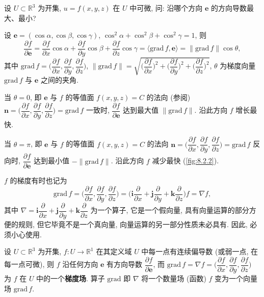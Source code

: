 \begin{example}\label{ex:8.2.4}
设 $U \subset \mathbb{R}^{3}$ 为开集, $u = f(x, y, z)$ 在 $U$ 中可微, 问: 沿哪个方向 $\boldsymbol{e}$ 的方向导数最大、最小?

\begin{solution}
设 $\boldsymbol{e} = (\cos\alpha, \cos\beta, \cos\gamma)$, $\cos^{2}\alpha + \cos^{2}\beta + \cos^{2}\gamma = 1$, 则
\[
  \frac{\partial f}{\partial \boldsymbol{e}} = \frac{\partial f}{\partial x}\cos\alpha + \frac{\partial f}{\partial y}\cos\beta + \frac{\partial f}{\partial z}\cos\gamma = \langle\mathrm{grad}\,f, \boldsymbol{e}\rangle = \|\mathrm{grad}\,f\|\cos\theta,
\]
其中 $\mathrm{grad}\,f = \Big(\dfrac{\partial f}{\partial x}, \dfrac{\partial f}{\partial y}, \dfrac{\partial f}{\partial z}\Big)$, $\|\mathrm{grad}\,f\| = \sqrt{\Big(\dfrac{\partial f}{\partial x}\Big)^{2} + \Big(\dfrac{\partial f}{\partial y}\Big)^{2} + \Big(\dfrac{\partial f}{\partial z}\Big)^{2}}$, $\theta$ 为梯度向量 $\mathrm{grad}\,f$ 与 $\boldsymbol{e}$ 之间的夹角.

当 $\theta = 0$, 即 $\boldsymbol{e}$ 与 $f$ 的等值面 $f(x, y, z) = C$ 的法向 (参阅) $\boldsymbol{n} = \Big(\dfrac{\partial f}{\partial x}, \dfrac{\partial f}{\partial y}, \dfrac{\partial f}{\partial z}\Big) = \mathrm{grad}\,f$ 一致时, $\dfrac{\partial f}{\partial \boldsymbol{e}}$ 达到最大值 $\|\mathrm{grad}\,f\|$. 沿此方向 $f$ 增长最快.

当 $\theta = \pi$, 即 $\boldsymbol{e}$ 与 $f$ 的等值面 $f(x, y, z) = C$ 的法向 $\boldsymbol{n} = \Big(\dfrac{\partial f}{\partial x}, \dfrac{\partial f}{\partial y}, \dfrac{\partial f}{\partial z}\Big) = \mathrm{grad}\,f$ 反向时, $\dfrac{\partial f}{\partial \boldsymbol{e}}$ 达到最小值 $-\|\mathrm{grad}\,f\|$. 沿此方向 $f$ 减少最快 (\cref{fig:8.2.2}).

$f$ 的梯度有时也记为
\[
  \mathrm{grad}\,f = \Big(\frac{\partial f}{\partial x}, \frac{\partial f}{\partial y}, \frac{\partial f}{\partial z}\Big) = \Big(\boldsymbol{i}\frac{\partial}{\partial x} + \boldsymbol{j}\frac{\partial}{\partial y} + \boldsymbol{k}\frac{\partial}{\partial z}\Big)f = \nabla f,
\]
其中 $\nabla = \boldsymbol{i}\dfrac{\partial}{\partial x} + \boldsymbol{j}\dfrac{\partial}{\partial y} + \boldsymbol{k}\dfrac{\partial}{\partial z}$ 为一个算子, 它是一个假向量, 具有向量运算的部分方便的规则, 但它毕竟不是一个真向量, 向量运算的另一部分性质未必具有. 因此, 必须小心使用.

设 $U \subset \mathbb{R}^{3}$ 为开集, $f: U \to \mathbb{R}^{1}$ 在其定义域 $U$ 中每一点有连续偏导数 (或弱一点, 在每一点可微), 则 $f$ 沿任何方向 $\boldsymbol{e}$ 有方向导数 $\dfrac{\partial f}{\partial \boldsymbol{e}}$, 而 $\mathrm{grad}\,f = \nabla f = \Big(\dfrac{\partial f}{\partial x}, \dfrac{\partial f}{\partial y}, \dfrac{\partial f}{\partial z}\Big)$ 为 $f$ 在 $U$ 中的一个\textbf{梯度场}. 算子 $\mathrm{grad}$ 即 $\nabla$ 将一个数量场 (函数) $f$ 变为一个向量场 $\mathrm{grad}\,f$. \noqedhere
\end{solution}
\end{example}

